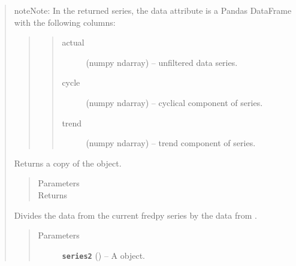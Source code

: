 \documentclass[letterpaper,10pt,english]{sphinxmanual}
\begin{document}
\begin{fulllineitems}
\begin{quote}
\begin{fulllineitems}
\begin{notice}{note}{Note:}
In the returned series, the data attribute is a Pandas DataFrame with the following columns:
\begin{quote}
\begin{quote}\begin{description}
\item[{actual}] \leavevmode
(numpy ndarray) --  unfiltered data series.

\item[{cycle}] \leavevmode
(numpy ndarray) --  cyclical component of series.

\item[{trend}] \leavevmode
(numpy ndarray) --  trend component of series.

\end{description}\end{quote}
\end{quote}
\end{notice}

\end{fulllineitems}


\begin{fulllineitems}
\label{series_class:fredpy.series.copy}
Returns a copy of the {\hyperref[series_class:fredpy.series]{}} object.
\begin{quote}\begin{description}
\item[{Parameters}] \leavevmode
\item[{Returns}] \leavevmode
{\hyperref[series_class:fredpy.series]{}}

\end{description}\end{quote}

\end{fulllineitems}


\begin{fulllineitems}
\label{series_class:fredpy.series.divide}
Divides the data from the current fredpy series by the data from .
\begin{quote}\begin{description}
\item[{Parameters}] \leavevmode
\textbf{\texttt{series2}} ({\hyperref[series_class:fredpy.series]{}}) -- A  object.


\end{description}
\end{quote}
\end{fulllineitems}
\end{quote}
\end{fulllineitems}
\end{document}
